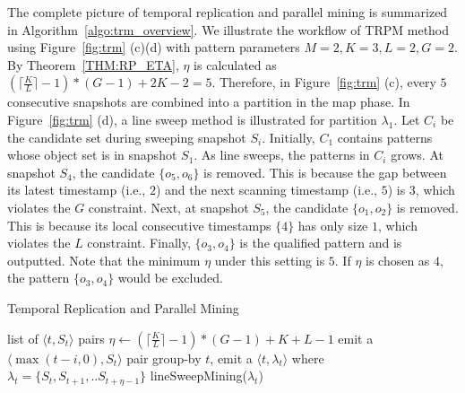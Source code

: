 The complete picture of temporal replication and parallel mining is summarized in Algorithm~\ref{algo:trm_overview}. We illustrate the workflow of TRPM method using Figure~\ref{fig:trm} (c)(d) with pattern
parameters $M=2, K=3, L = 2, G=2$. By Theorem~\ref{THM:RP_ETA}, $\eta$ is calculated
as $(\lceil \frac{K}{L} \rceil-1) *(G-1)+2K - 2 = 5$. Therefore, 
in Figure~\ref{fig:trm} (c), every $5$ consecutive snapshots are combined 
into a partition in the map phase. In Figure~\ref{fig:trm} (d), a line sweep
method is illustrated for partition $\lambda_1$. Let $C_i$ be the candidate set
during sweeping snapshot $S_i$.
Initially, $C_1$ contains patterns whose object set is in snapshot $S_1$.
As line sweeps, the patterns in $C_i$ grows. At snapshot $S_4$, the candidate
$\{o_5,o_6\}$ is removed. This is because the gap between its latest timestamp (i.e., $2$)
and the next scanning timestamp (i.e., $5$) is $3$, which violates the $G$ constraint.
Next, at snapshot $S_5$, the candidate $\{o_1,o_2\}$ is removed. This is
because its local consecutive timestamps $\{4\}$ has only size $1$,
which violates the $L$ constraint.
Finally, $\{o_3,o_4\}$ is the qualified pattern and is outputted. Note that the minimum $\eta$
under this setting is $5$. If $\eta$ is chosen as $4$, the pattern $\{o_3,o_4\}$ would be excluded. 

\begin{algorithm}[h]
\caption{Temporal Replication and Parallel Mining}
\label{algo:trm_overview}
\begin{algorithmic}[1]
\Require list of $\langle t, S_t \rangle$ pairs
\State $\eta \gets (\lceil \frac{K}{L} \rceil -1)*(G-1)+K+L-1$
\label{code:trm-map-start}
		\State emit a $\langle \max(t-i,0), S_t \rangle$ pair
	\EndFor  
\EndFor
\label{code:trm-map-end}
\label{code:trm-par-start}
\State group-by $t$, emit a $\langle t, \lambda_t\rangle$
\State where $\lambda_t = \{S_t, S_{t+1}, .. S_{t+\eta-1}\} $
\EndFor
\label{code:trm-par-end}
\label{code:trm-red-start}
\State lineSweepMining($\lambda_t$)
\label{code:trm-red-end}
\EndFor
\end{algorithmic}
\end{algorithm}

